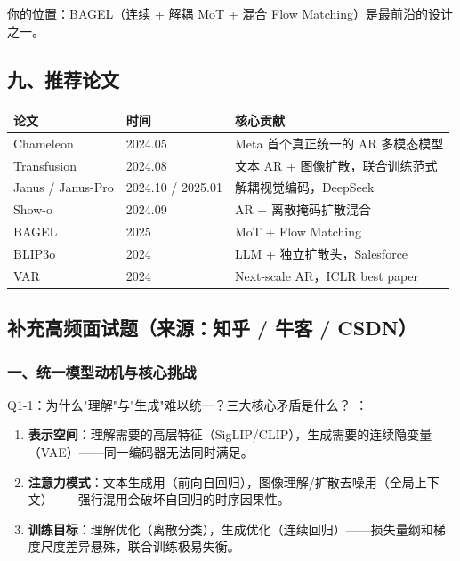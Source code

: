 \begin{summarybox}
你的位置：BAGEL（连续 + 解耦 MoT + 混合 Flow Matching）是最前沿的设计之一。
\end{summarybox}

\subsection{九、推荐论文}

\begin{center}
{\small
\begin{tabular}{|l|l|p{9cm}|}
\hline
\textbf{论文} & \textbf{时间} & \textbf{核心贡献} \\
\hline
Chameleon & 2024.05 & Meta 首个真正统一的 AR 多模态模型 \\
Transfusion & 2024.08 & 文本 AR + 图像扩散，联合训练范式 \\
Janus / Janus-Pro & 2024.10 / 2025.01 & 解耦视觉编码，DeepSeek \\
Show-o & 2024.09 & AR + 离散掩码扩散混合 \\
BAGEL & 2025 & MoT + Flow Matching \\
BLIP3o & 2024 & LLM + 独立扩散头，Salesforce \\
VAR & 2024 & Next-scale AR，ICLR best paper \\
\hline
\end{tabular}
}
\end{center}

\subsection{补充高频面试题（来源：知乎 / 牛客 / CSDN）}

\subsubsection{一、统一模型动机与核心挑战}

\begin{conceptbox}{Q1-1：为什么"理解"与"生成"难以统一？三大核心矛盾是什么？}
：
\begin{enumerate}
  \item \textbf{表示空间}：理解需要的高层特征（SigLIP/CLIP），生成需要的连续隐变量（VAE）——同一编码器无法同时满足。
  \item \textbf{注意力模式}：文本生成用（前向自回归），图像理解/扩散去噪用（全局上下文）——强行混用会破坏自回归的时序因果性。
  \item \textbf{训练目标}：理解优化（离散分类），生成优化（连续回归）——损失量纲和梯度尺度差异悬殊，联合训练极易失衡。
\end{enumerate}
\end{conceptbox}

